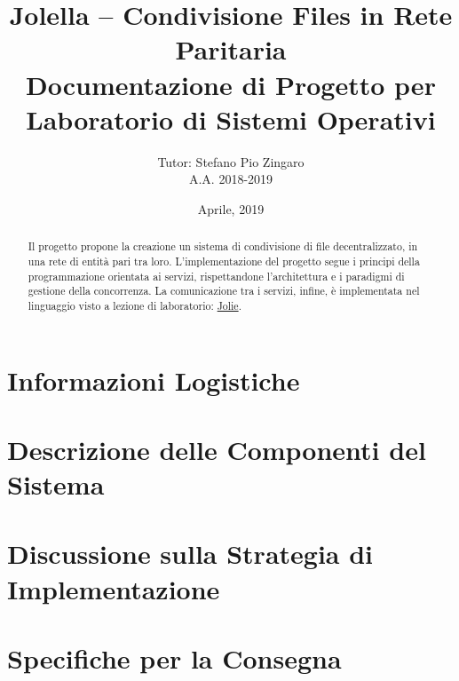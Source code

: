\documentclass{article}
\title{%
  Jolella -- Condivisione Files in Rete Paritaria\\
  \large Documentazione di Progetto per Laboratorio di Sistemi Operativi}
\author{%
  Tutor: Stefano Pio Zingaro\\
  A.A. 2018-2019}
\begin{document}
\maketitle
\date{Aprile, 2019}

\begin{abstract}

 Il progetto propone la creazione un sistema di condivisione di file
 decentralizzato, in una rete di entità pari tra loro.
 L'implementazione del progetto segue i principi della programmazione orientata
 ai servizi, rispettandone l'architettura e i paradigmi di gestione della
 concorrenza. La comunicazione tra i servizi, infine, è implementata nel
 linguaggio visto a lezione di laboratorio: \href{http://jolie-lang.org}{Jolie}.

\end{abstract}

\newpage

\tableofcontents

\newpage

\section{Informazioni Logistiche}
\label{sec:logistic}


\newpage

\section{Descrizione delle Componenti del Sistema}
\label{sec:components}


\newpage

\section{Discussione sulla Strategia di Implementazione}
\label{sec:impl}


\newpage

\section{Specifiche per la Consegna}
\label{sec:delivery}


\newpage



\end{document}
